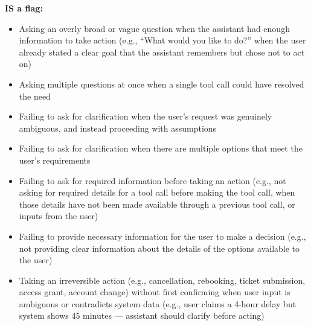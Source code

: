 \begin{tcolorbox}[promptbox, title={\small Conversation Progression Prompt}]
      \textbf{IS a flag:}
      \begin{itemize}
        \item Asking an overly broad or vague question when the assistant had enough information to take action (e.g., ``What would you like to do?'' when the user already stated a clear goal that the assistant remembers but chose not to act on)
        \item Asking multiple questions at once when a single tool call could have resolved the need
        \item Failing to ask for clarification when the user's request was genuinely ambiguous, and instead proceeding with assumptions
        \item Failing to ask for clarification when there are multiple options that meet the user's requirements
        \item Failing to ask for required information before taking an action (e.g., not asking for required details for a tool call before making the tool call, when those details have not been made available through a previous tool call, or inputs from the user)
        \item Failing to provide necessary information for the user to make a decision (e.g., not providing clear information about the details of the options available to the user)
        \item Taking an irreversible action (e.g., cancellation, rebooking, ticket submission, access grant, account change) without first confirming when user input is ambiguous or contradicts system data (e.g., user claims a 4-hour delay but system shows 45 minutes --- assistant should clarify before acting)
      \end{itemize}


\end{tcolorbox}
